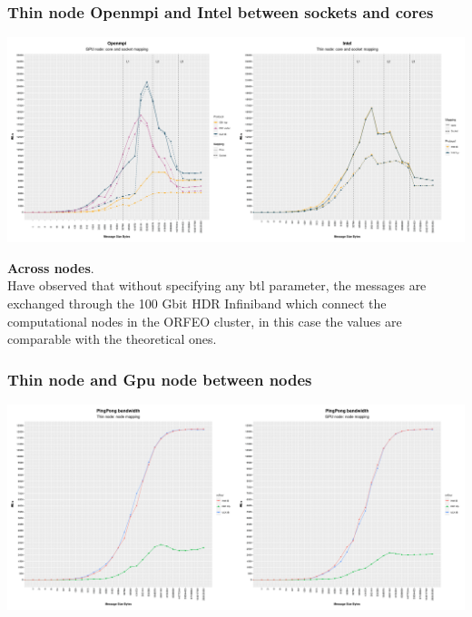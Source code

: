 \documentclass[11pt,a4paper]{report}
\theoremstyle{definition}
\begin{document}
\subsubsection{Thin node Openmpi and Intel between sockets and cores}
\begin{center}
\includegraphics[scale=.25]{gpu_intel_openmpi}
\end{center}
\textbf{Across nodes}.\\
Have observed that without specifying any btl parameter, the messages are exchanged through the 100 Gbit HDR Infiniband which connect the computational nodes in the ORFEO cluster, in this case the values are comparable with the theoretical ones.
\subsubsection{Thin node and Gpu node between nodes}
\begin{center}
\includegraphics[scale=.25]{node_mapping}
\end{center}
\end{document}
